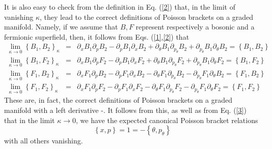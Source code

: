 \documentclass[a4paper,11pt]{article}
\begin{document}
It is also easy to check from the definition in Eq. (\ref{2}) that, in
the limit of vanishing $\kappa$, they lead to the correct definitions
of Poisson brackets on a graded manifold. Namely, if we assume that
$B, F$ represent respectively a bosonic and a fermionic superfield,
then, it follows from Eqs. (\ref{1},\ref{2}) that
\begin{eqnarray}
\lim_{\kappa\rightarrow 0} \left\{B_{1},B_{2}\right\}_{\kappa} & = &
\partial_{x}B_{1}\partial_{p}B_{2}-\partial_{p}B_{1}\partial_{x}B_{2}+
\partial_{\theta}B_{1}\partial_{p_{\theta}}B_{2}+
\partial_{p_{\theta}}B_{1}\partial_{\theta}B_{2} =
\left\{B_{1},B_{2}\right\}\nonumber\\
\lim_{\kappa\rightarrow 0} \left\{B_{1},F_{2}\right\}_{\kappa} & = &
\partial_{x}B_{1}\partial_{p}F_{2}-\partial_{p}B_{1}\partial_{x}F_{2}+
\partial_{\theta}B_{1}\partial_{p_{\theta}}F_{2}+
\partial_{p_{\theta}}B_{1}\partial_{\theta}F_{2} =
\left\{B_{1},F_{2}\right\}\nonumber\\
\lim_{\kappa\rightarrow 0} \left\{F_{1},B_{2}\right\}_{\kappa} & = &
\partial_{x}F_{1}\partial_{p}B_{2}-\partial_{p}F_{1}\partial_{x}B_{2}-
\partial_{\theta}F_{1}\partial_{p_{\theta}}B_{2}-
\partial_{p_{\theta}}F_{1}\partial_{\theta}B_{2} =
\left\{F_{1},B_{2}\right\}\nonumber\\
\lim_{\kappa\rightarrow 0} \left\{F_{1},F_{2}\right\}_{\kappa} & = &
\partial_{x}F_{1}\partial_{p}F_{2}-\partial_{p}F_{1}\partial_{x}F_{2}-
\partial_{\theta}F_{1}\partial_{p_{\theta}}F_{2}-
\partial_{p_{\theta}}F_{1}\partial_{\theta}F_{2} =
\left\{F_{1},F_{2}\right\}\label{4}
\end{eqnarray}
These are, in fact, the correct definitions of Poisson brackets on a
graded manifold with a left derivative \cite{18}-\cite{19}. It follows
from  this, as well
as from Eq. (\ref{3}) that in the limit $\kappa\rightarrow 0$, we have
the expected canonical Poisson bracket relations
\begin{equation}
\left\{x,p\right\} = 1 = - \left\{\theta,p_{\theta}\right\}
\end{equation}
with all others vanishing.
\end{document}
